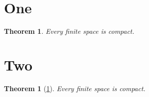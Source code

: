 \documentclass{article}
\newtheorem{theorem}{Theorem}[section]
\theoremstyle{again}
\newtheorem{repthm}{Theorem}
\begin{document}
\section{One}
\begin{theorem}\label{thm:main} Every finite space is compact. \end{theorem}
\section{Two}
\begin{repthm}[\ref{thm:main}] Every finite space is compact. \end{repthm}
\end{document}

